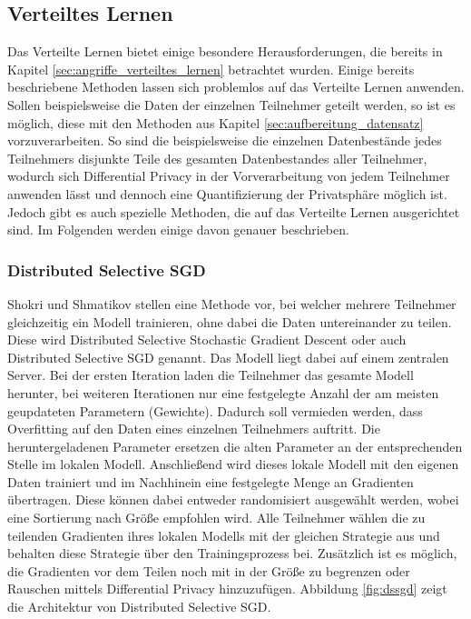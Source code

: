 \subsection{Verteiltes Lernen}\label{sec:verteiltes_lernen}

Das Verteilte Lernen bietet einige besondere Herausforderungen, die bereits in Kapitel \ref{sec:angriffe_verteiltes_lernen} betrachtet wurden. 
Einige bereits beschriebene Methoden lassen sich problemlos auf das Verteilte Lernen anwenden.
Sollen beispielsweise die Daten der einzelnen Teilnehmer geteilt werden, so ist es möglich, diese mit den Methoden aus Kapitel \ref{sec:aufbereitung_datensatz} vorzuverarbeiten.
So sind die beispielsweise die einzelnen Datenbestände jedes Teilnehmers disjunkte Teile des gesamten Datenbestandes aller Teilnehmer, wodurch sich Differential Privacy in der Vorverarbeitung von jedem Teilnehmer anwenden lässt und dennoch eine Quantifizierung der Privatsphäre möglich ist.
Jedoch gibt es auch spezielle Methoden, die auf das Verteilte Lernen ausgerichtet sind.
Im Folgenden werden einige davon genauer beschrieben.

\subsubsection*{Distributed Selective SGD}
Shokri und Shmatikov \cite{P-78} stellen eine Methode vor, bei welcher mehrere Teilnehmer gleichzeitig ein Modell trainieren, ohne dabei die Daten untereinander zu teilen.
Diese wird Distributed Selective Stochastic Gradient Descent oder auch Distributed Selective SGD genannt.
Das Modell liegt dabei auf einem zentralen Server.
Bei der ersten Iteration laden die Teilnehmer das gesamte Modell herunter, bei weiteren Iterationen nur eine festgelegte Anzahl der am meisten geupdateten Parametern (Gewichte).
Dadurch soll vermieden werden, dass Overfitting auf den Daten eines einzelnen Teilnehmers auftritt.
Die heruntergeladenen Parameter ersetzen die alten Parameter an der entsprechenden Stelle im lokalen Modell.
Anschließend wird dieses lokale Modell mit den eigenen Daten trainiert und im Nachhinein eine festgelegte Menge an Gradienten übertragen. 
Diese können dabei entweder randomisiert ausgewählt werden, wobei eine Sortierung nach Größe empfohlen wird.
Alle Teilnehmer wählen die zu teilenden Gradienten ihres lokalen Modells mit der gleichen Strategie aus und behalten diese Strategie über den Trainingsprozess bei.
Zusätzlich ist es möglich, die Gradienten vor dem Teilen noch mit in der Größe zu begrenzen oder Rauschen mittels Differential Privacy hinzuzufügen.
Abbildung \ref{fig:dssgd} zeigt die Architektur von Distributed Selective SGD.

